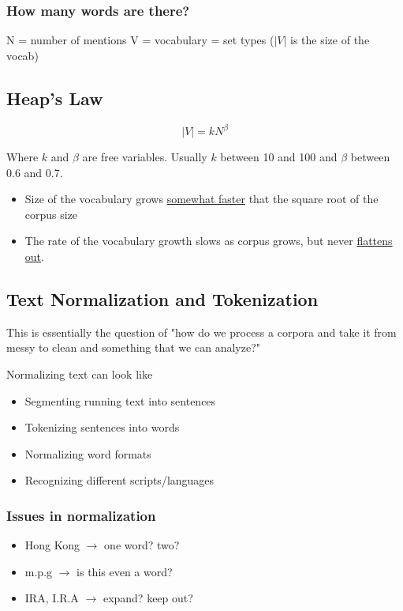 \documentclass[11pt]{article}
\begin{document}
\subsubsection*{How many words are there?}

N = number of mentions V = vocabulary = set types ($|V|$ is the size of the
vocab)

\subsection{Heap's Law}

\[
	|V| = kN^{\beta}
\]

Where $k$ and $\beta$ are free variables. Usually $k$ between 10 and 100 and
$\beta$ between 0.6 and 0.7.

\begin{itemize}
	\item Size of the vocabulary grows \ul{somewhat faster} that the square root
	      of the corpus size
	\item The rate of the vocabulary growth slows as corpus grows, but never
	      \ul{flattens out}.
\end{itemize}

\subsection{Text Normalization and Tokenization}

This is essentially the question of "how do we process a corpora and take it
from messy to clean and something that we can analyze?"

Normalizing text can look like

\begin{itemize}
	\item Segmenting running text into sentences
	\item Tokenizing sentences into words
	\item Normalizing word formats
	\item Recognizing different scripts/languages
\end{itemize}

\subsubsection{Issues in normalization}

\begin{itemize}
	\item Hong Kong $\rightarrow$ one word? two?
	\item m.p.g $\rightarrow$ is this even a word?
	\item IRA, I.R.A $\rightarrow$ expand? keep out?
\end{itemize}
\end{document}
